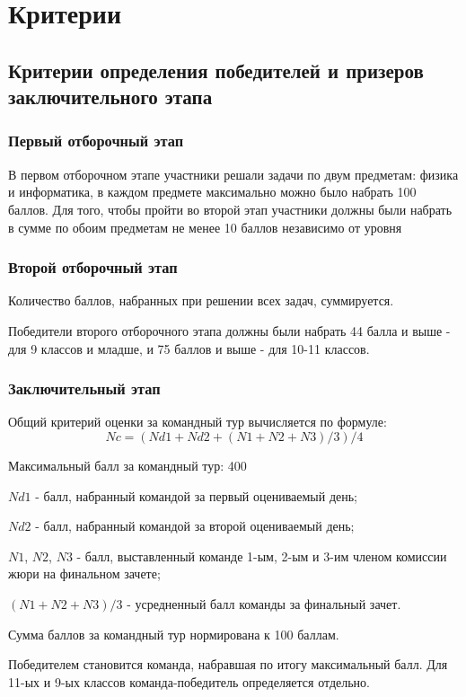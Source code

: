 \part{Критерии}

\chapter{Критерии определения победителей и призеров заключительного этапа}

\section{Первый отборочный этап}

В первом отборочном этапе участники решали задачи по двум предметам: физика и информатика, в каждом предмете максимально можно было набрать 100 баллов. Для того, чтобы пройти во второй этап участники  должны были набрать в сумме по обоим предметам не менее 10 баллов независимо от уровня

\section{Второй отборочный этап}

Количество баллов, набранных при решении всех задач, суммируется. 

Победители второго отборочного этапа должны были набрать 44 балла и выше - для 9 классов и младше, и 75 баллов и выше -  для 10-11 классов. 

\section{Заключительный этап}

Общий критерий оценки за командный тур вычисляется по формуле:
$$Nc = (Nd1 + Nd2 + (N1 + N2 + N3)/3)/4$$

Максимальный балл за командный тур: 400

$Nd1$ - балл, набранный командой за первый оцениваемый день;

$Nd2$ - балл, набранный командой за второй оцениваемый день;

$N1$, $N2$, $N3$ - балл, выставленный команде 1-ым, 2-ым и 3-им членом комиссии жюри на финальном зачете;

$(N1 + N2 + N3)/3$ - усредненный балл команды за финальный зачет.

Сумма баллов за командный тур нормирована к 100 баллам.

Победителем становится команда, набравшая по итогу максимальный балл. Для 11-ых и 9-ых классов команда-победитель определяется отдельно.

